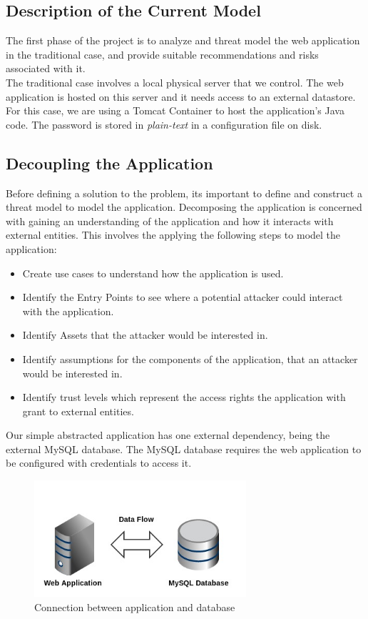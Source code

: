 \documentclass[11pt, a4paper, notitlepage]{article}
\begin{document}
\subsection*{Description of the Current Model}
The first phase of the project is to analyze and threat model the web application in the traditional case, and provide suitable recommendations and risks associated with it. \\

The traditional case involves a local physical server that we control. The web application is hosted on this server and it needs access to an external datastore. For this case, we are using a Tomcat Container to host the application's Java code. The password is stored in \emph{plain-text} in a configuration file on disk. \\

\subsection*{Decoupling the Application}
Before defining a solution to the problem, its important to define and construct a threat model to model the application. Decomposing the application is concerned with gaining an understanding of the application and how it interacts with external entities. This involves the applying the following steps to model the application:  

\begin{itemize}
  \item Create use cases to understand how the application is used.
  \item Identify the Entry Points to see where a potential attacker could interact with the application.
  \item Identify Assets that the attacker would be interested in.
  \item Identify assumptions for the components of the application, that an attacker would be interested in.
  \item Identify trust levels which represent the access rights the application with grant to external entities. 
\end{itemize}

Our simple abstracted application has one external dependency, being the external MySQL database.  The MySQL database requires the web application to be configured with credentials to access it. 

\begin{figure}[h!]
    \centering
    \includegraphics[width=0.7\textwidth]{external-overview.jpg}
    \caption{Connection between application and database}
\end{figure}
\end{document}
